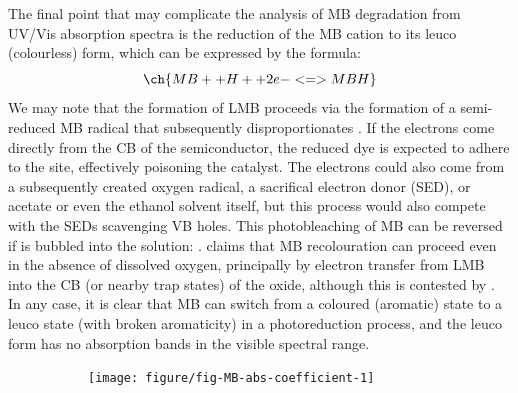 \documentclass[9pt,twoside,twocolumn]{article}\usepackage{knitr}
\begin{document}
\begin{refsection}
The final point that may complicate the analysis of MB degradation from UV/Vis absorption spectra is the reduction of the MB cation to its leuco (colourless) form, which can be expressed by the formula: \cite{Bard2008,Hallock2003,Resch1990}
\begin{equation}\label{eq:MB-reduction}
\ch{MB+ + H+ + 2 e- <=> MBH}
\end{equation}
We may note that the formation of LMB proceeds via the formation of a semi-reduced MB radical  that subsequently disproportionates . \cite{Mills1999}
If the electrons come directly from the CB of the semiconductor, the reduced dye is expected to adhere to the  site, effectively poisoning the catalyst. \cite{Baruah2009,Bora2016} 
The electrons could also come from a subsequently created oxygen radical, a sacrifical electron donor (SED), or acetate or even the ethanol solvent itself, but this process would also compete with the SEDs scavenging VB holes. \cite{DeTacconi1997}
This photobleaching of MB can be reversed if  is bubbled into the solution: . \cite{Mills1999}
\textcite{DeTacconi1997} claims that MB recolouration can proceed even in the absence of dissolved oxygen, principally by electron transfer from LMB into the CB (or nearby trap states) of the oxide, although this is contested by \textcite{Mills1999}. 
In any case, it is clear that MB can switch from a coloured (aromatic) state to a leuco state (with broken aromaticity) in a photoreduction process, and the leuco form has no absorption bands in the visible spectral range.

\begin{figure}[tbp]
\centering
\begin{subfigure}[b]{\linewidth}
\caption{}
\label{fig:MB-abs-coefficient}
\begin{knitrout}\footnotesize
{}\color{fgcolor}

{\centering \texttt{[image: figure/fig-MB-abs-coefficient-1]} 

}


\end{knitrout}
\end{subfigure}\\
\begin{subfigure}[b]{0.49\linewidth}
\caption{}
\label{fig:MB-water-fitted}
\begin{knitrout}\footnotesize
{}\color{fgcolor}


\end{knitrout}
\end{subfigure}
\end{figure}
\end{refsection}
\end{document}
